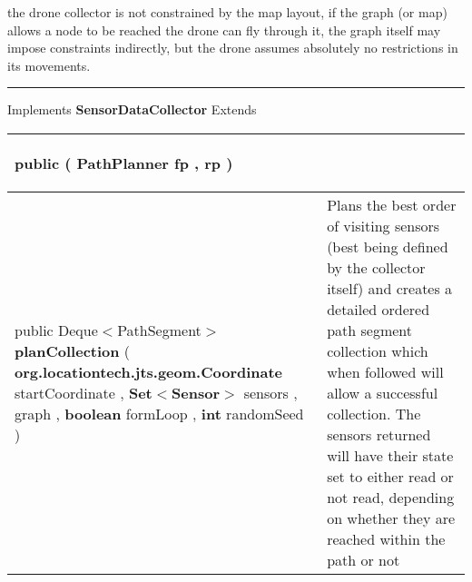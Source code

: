  {\scriptsize the drone collector is not constrained by the map layout, if the graph (or map) allows a node to be reached\newline%
 the drone can fly through it, the graph itself may impose constraints indirectly, but the drone assumes absolutely no restrictions in its movements.
 
\vspace*{4pt} \hrule \vspace*{3pt}
Implements \textbf{ SensorDataCollector }
Extends \textbf{ \hyperref[tab:BaseDataCollector]{\color{blue}{BaseDataCollector}} }
\vspace*{-5pt} 
\begin{tabularx}{\linewidth}{X|m{}}
\label{tab:Drone}
\begin{raggedleft}public  \textbf{\hyperref[tab:Drone]{\color{blue}{Drone}} }(\newline \hfill 
\hspace*{ 5pt} \textbf{PathPlanner} fp , \newline
 \hspace*{ 5pt} \textbf{\hyperref[tab:BaseCollectionOrderPlanner]{\color{blue}{BaseCollectionOrderPlanner}}} rp  )
\end{raggedleft} &
 \\ \hline 
\begin{raggedleft}public Deque$<$PathSegment$>$ \textbf{planCollection }(\newline \hfill 
\hspace*{ 5pt} \textbf{org.locationtech.jts.geom.Coordinate} startCoordinate , \newline
 \hspace*{ 5pt} \textbf{Set$<$Sensor$>$} sensors , \newline
 \hspace*{ 5pt} \textbf{\hyperref[tab:ConstrainedTreeGraph]{\color{blue}{ConstrainedTreeGraph}}} graph , \newline
 \hspace*{ 5pt} \textbf{boolean} formLoop , \newline
 \hspace*{ 5pt} \textbf{int} randomSeed  )
\end{raggedleft} &
 Plans the best order of visiting sensors (best being defined by the collector itself)\newline%
 and creates a detailed ordered path segment collection which when followed will allow a successful collection. \newline%
 The sensors returned will have their state set to either\newline%
 read or not read, depending on whether they are reached within the path or not\\\end{tabularx}
}
